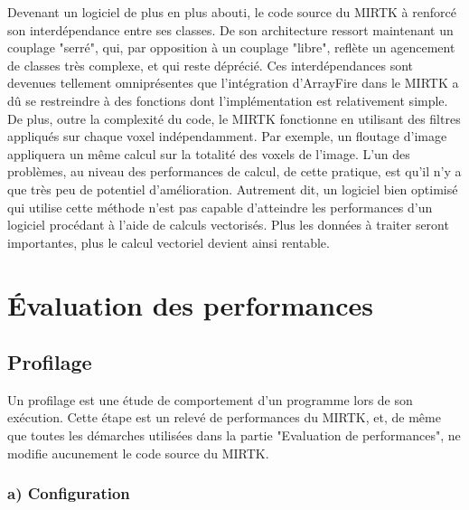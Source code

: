 \documentclass[10pt]{report}
\begin{document}
	Devenant un logiciel de plus en plus abouti, le code source du MIRTK à renforcé son interdépendance entre ses classes. De son architecture ressort maintenant un couplage "serré", qui, par opposition à un couplage "libre", reflète un agencement de classes très complexe, et qui reste déprécié. Ces interdépendances sont devenues tellement omniprésentes que l'intégration d'ArrayFire dans le MIRTK a dû se restreindre à des fonctions dont l'implémentation est relativement simple. \\
	
	De plus, outre la complexité du code, le MIRTK fonctionne en utilisant des filtres appliqués sur chaque voxel indépendamment. Par exemple, un floutage d'image appliquera un même calcul sur la totalité des voxels de l'image. L'un des problèmes, au niveau des performances de calcul, de cette pratique, est qu'il n'y a que très peu de potentiel d'amélioration. Autrement dit, un logiciel bien optimisé qui utilise cette méthode n'est pas capable d'atteindre les performances d'un logiciel procédant à l'aide de calculs vectorisés. Plus les données à traiter seront importantes, plus le calcul vectoriel devient ainsi rentable.
	
	

	
	\section{Évaluation des performances}
		\subsection{Profilage}
Un profilage est une étude de comportement d'un programme lors de son exécution. Cette étape est un relevé de performances du MIRTK, et, de même que toutes les démarches utilisées dans la partie "Evaluation de performances", ne modifie aucunement le code source du MIRTK. 

		\subsubsection{a) Configuration}
\end{document}
